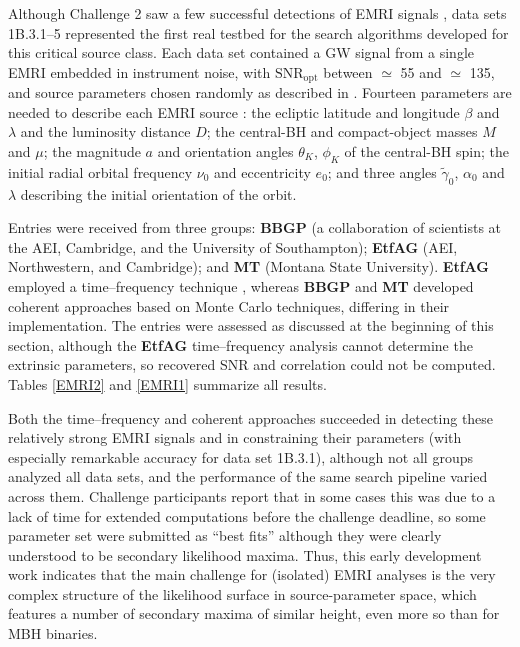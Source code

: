 \documentclass{iopart}
\begin{document}
Although Challenge 2 saw a few successful detections of EMRI signals \cite{mldcamaldi2}, data sets 1B.3.1--5 represented the first real testbed for the search algorithms developed for this critical source class. Each data set contained a GW signal from a single EMRI embedded in instrument noise, with $\mathrm{SNR}_\mathrm{opt}$ between $\simeq$ 55 and $\simeq$ 135, and source parameters chosen randomly as described in \cite{mldcgwdaw2}. Fourteen parameters are needed to describe each EMRI source \cite{mldcgwdaw2}: 
the ecliptic latitude and longitude $\beta$ and $\lambda$ and the luminosity distance $D$; the central-BH and compact-object masses $M$ and $\mu$;  the magnitude $a$ and orientation angles $\theta_K$, $\phi_K$ of the central-BH spin; the initial radial orbital frequency $\nu_0$ and eccentricity $e_0$; and three angles $\tilde{\gamma}_0$, $\alpha_0$ and $\lambda$ describing the initial orientation of the orbit.

Entries were received from three groups: \textbf{BBGP} (a collaboration of scientists at the AEI, Cambridge, and the University of Southampton); \textbf{EtfAG} (AEI, Northwestern, and Cambridge); and \textbf{MT} (Montana State University).
\textbf{EtfAG} employed a time--frequency technique \cite{gmw}, whereas \textbf{BBGP} \cite{bbgpemri} and \textbf{MT} \cite{cornishemri} developed coherent approaches based on Monte Carlo techniques, differing in their implementation.
The entries were assessed as discussed at the beginning of this section, although the \textbf{EtfAG} time--frequency analysis cannot determine the extrinsic parameters, so recovered SNR and correlation could not be computed. Tables \ref{EMRI2} and \ref{EMRI1} summarize all results.

Both the time--frequency and coherent approaches succeeded in detecting these relatively strong EMRI signals and in constraining their parameters (with especially remarkable accuracy for data set 1B.3.1), although not all groups analyzed all data sets, and the performance of the same search pipeline varied across them. Challenge participants report that in some cases this was due to a lack of time for extended computations before the challenge deadline, so some parameter set were submitted as ``best fits'' although they were clearly understood to be secondary likelihood maxima. Thus, this early development work indicates that the main challenge for (isolated) EMRI analyses is the very complex structure of the likelihood surface in source-parameter space, which features a number of secondary maxima of similar height, even more so than for MBH binaries.
\end{document}
